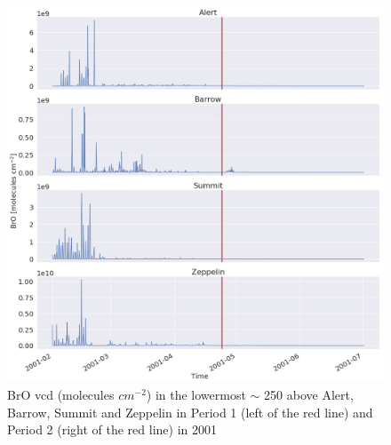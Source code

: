 \begin{figure}[h]
    \centering
    \includegraphics[width=\linewidth]{Chapter6_Results/images/Vert_StationComp_2001/BrO_VCD_2001.png}
    \caption{BrO \acrshort{vcd} (molecules $ cm^{-2}$) in the lowermost $\sim$ 250 above Alert, Barrow, Summit and Zeppelin in Period 1 (left of the red line) and Period 2 (right of the red line) in 2001}
    \label{fig:BrO_VCD_2001}
\end{figure}